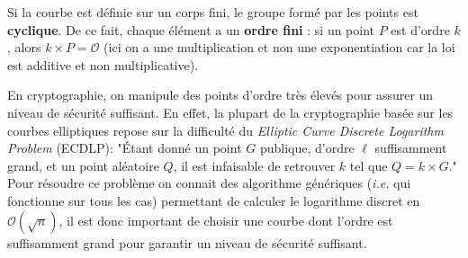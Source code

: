 \documentclass[french,a4paper,11pt]{exam}
\begin{document}
Si la courbe est définie sur un corps fini, le groupe formé par les points est \textbf{cyclique}. De ce fait, chaque élément a un \textbf{ordre fini} : si un point $P$ est d'ordre $k$, alors $k\times P = \mathcal{O}$ (ici on a une multiplication et non une exponentiation car la loi est additive et non multiplicative).

En cryptographie, on manipule des points d'ordre très élevés pour assurer un niveau de sécurité suffisant. 
En effet, la plupart de la cryptographie basée sur les courbes elliptiques repose sur la difficulté du \textit{Elliptic Curve Discrete Logarithm Problem} (ECDLP): 
"Étant donné un point $G$ publique, d'ordre $\ell$ suffisamment grand, et un point aléatoire $Q$, il est infaisable de retrouver $k$ tel que $Q = k\times G$." 
Pour résoudre ce problème on connait des algorithme génériques (\textit{i.e.} qui fonctionne sur tous les cas) permettant de calculer le logarithme discret en $\mathcal{O}(\sqrt n)$, il est donc important de choisir une courbe dont l'ordre est suffisamment grand pour garantir un niveau de sécurité suffisant. 
\vspace*{0.2cm}
\end{document}
